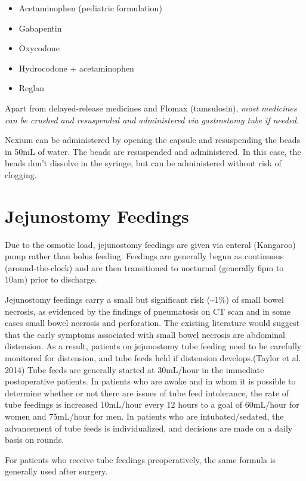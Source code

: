 \documentclass[
  letterpaper,
]{scrbook}
\providecommand{\tightlist}{%
  \setlength{\itemsep}{0pt}\setlength{\parskip}{0pt}}
\begin{document}
\begin{itemize}
\tightlist
\item
  Acetaminophen (pediatric formulation)
\item
  Gabapentin
\item
  Oxycodone
\item
  Hydrocodone + acetaminophen
\item
  Reglan
\end{itemize}

Apart from delayed-release medicines and Flomax (tamsulosin), \emph{most
medicines can be crushed and resuspended and administered via
gastrostomy tube if needed}.

Nexium can be administered by opening the capsule and resuspending the
beads in 50mL of water. The beads are resuspended and administered. In
this case, the beads don't dissolve in the syringe, but can be
administered without risk of clogging.

\chapter{Jejunostomy Feedings}\label{jejunostomy-feedings}

Due to the osmotic load, jejunostomy feedings are given via enteral
(Kangaroo) pump rather than bolus feeding. Feedings are generally begun
as continuous (around-the-clock) and are then transitioned to nocturnal
(generally 6pm to 10am) prior to discharge.

Jejunostomy feedings carry a small but significant risk
(\textasciitilde1\%) of small bowel necrosis, as evidenced by the
findings of pneumatosis on CT scan and in some cases small bowel
necrosis and perforation. The existing literature would suggest that the
early symptoms associated with small bowel necrosis are abdominal
distension. As a result, patients on jejunostomy tube feeding need to be
carefully monitored for distension, and tube feeds held if distension
develops.(Taylor et al. 2014) Tube feeds are generally started at
30mL/hour in the immediate postoperative patients. In patients who are
awake and in whom it is possible to determine whether or not there are
issues of tube feed intolerance, the rate of tube feedings is increased
10mL/hour every 12 hours to a goal of 60mL/hour for women and 75mL/hour
for men. In patients who are intubated/sedated, the advancement of tube
feeds is individualized, and decisions are made on a daily basis on
rounds.

For patients who receive tube feedings preoperatively, the same formula
is generally used after surgery.
\end{document}

